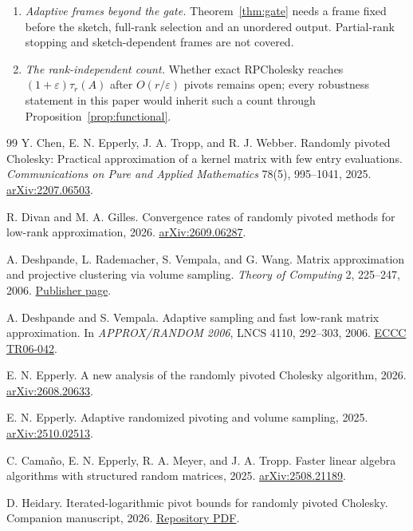 \documentclass[11pt]{article}
\theoremstyle{definition}\newtheorem{definition}[theorem]{Definition}
\theoremstyle{remark}\newtheorem{remark}[theorem]{Remark}
\newcommand{\eps}{\varepsilon}
\newcommand{\1}{\mathbf 1}
\begin{document}
\begin{enumerate}[label=\arabic*.,leftmargin=1.6em]
\item \emph{Adaptive frames beyond the gate.} Theorem~\ref{thm:gate}
needs a frame fixed before the sketch, full-rank selection and an
unordered output. Partial-rank stopping and sketch-dependent frames are
not covered.

\item \emph{The rank-independent count.} Whether exact RPCholesky reaches
$(1+\eps)\tau_r(A)$ after $O(r/\eps)$ pivots remains open; every
robustness statement in this paper would inherit such a count through
Proposition~\ref{prop:functional}.
\end{enumerate}

\begin{thebibliography}{99}
Y. Chen, E. N. Epperly, J. A. Tropp, and R. J. Webber.
Randomly pivoted Cholesky: Practical approximation of a kernel matrix
with few entry evaluations. \emph{Communications on Pure and Applied
Mathematics} 78(5), 995--1041, 2025.
\href{https://arxiv.org/abs/2207.06503}{arXiv:2207.06503}.

R. Divan and M. A. Gilles. Convergence rates of randomly pivoted methods
for low-rank approximation, 2026.
\href{https://arxiv.org/abs/2609.06287}{arXiv:2609.06287}.

A. Deshpande, L. Rademacher, S. Vempala, and G. Wang.
Matrix approximation and projective clustering via volume sampling.
\emph{Theory of Computing} 2, 225--247, 2006.
\href{https://www.theoryofcomputing.org/articles/v002a012/}{Publisher page}.

A. Deshpande and S. Vempala. Adaptive sampling and fast low-rank matrix
approximation. In \emph{APPROX/RANDOM 2006}, LNCS 4110, 292--303, 2006.
\href{https://eccc.weizmann.ac.il/report/2006/042/}{ECCC TR06-042}.

E. N. Epperly. A new analysis of the randomly pivoted Cholesky
algorithm, 2026.
\href{https://arxiv.org/abs/2608.20633}{arXiv:2608.20633}.

E. N. Epperly. Adaptive randomized pivoting and volume sampling, 2025.
\href{https://arxiv.org/abs/2510.02513}{arXiv:2510.02513}.

C. Cama\~no, E. N. Epperly, R. A. Meyer, and J. A. Tropp.
Faster linear algebra algorithms with structured random matrices, 2025.
\href{https://arxiv.org/abs/2508.21189}{arXiv:2508.21189}.

D. Heidary. Iterated-logarithmic pivot bounds for randomly pivoted
Cholesky. Companion manuscript, 2026.
\href{https://github.com/DiarHaidary/Results/blob/main/manuscripts/background/Iterated_Logarithmic_RPCholesky.pdf}{Repository PDF}.


\end{thebibliography}
\end{document}
